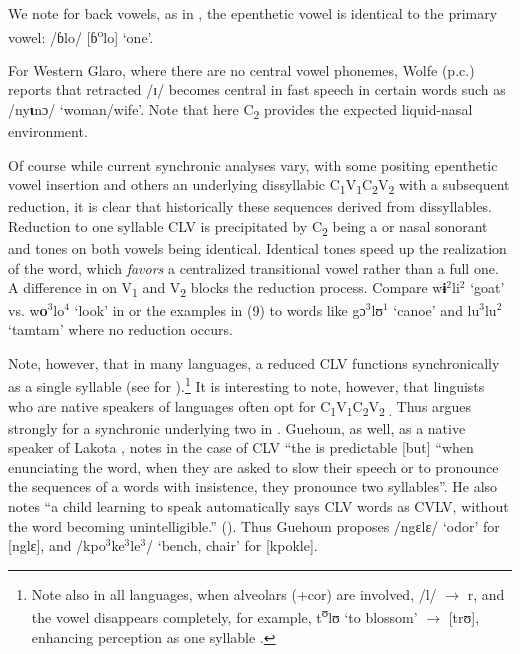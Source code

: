 \documentclass[output=paper,newtxmath,modfonts,nonflat]{langsci/langscibook}
\begin{document}
We note for back vowels, as in , the epenthetic vowel is identical to the primary vowel: /ɓlo/ [ɓ\textsuperscript{o}lo] ‘one’.  

For Western Glaro, where there are no central vowel phonemes, Wolfe (p.c.) reports that retracted /ɪ/ becomes central in fast speech in certain words such as /ny\textbf{ɩ}nɔ/ ‘woman/wife’. Note that here C\textsubscript{2} provides the expected liquid-nasal environment. 

Of course while current synchronic analyses vary, with some positing epenthetic vowel insertion and others an underlying dissyllabic C\textsubscript{1}V\textsubscript{1}C\textsubscript{2}V\textsubscript{2} with a subsequent reduction, it is clear that historically these sequences derived from dissyllables. Reduction to one syllable CLV is precipitated by C\textsubscript{2} being a  or nasal sonorant and tones on both vowels being identical. Identical tones speed up the realization of the word, which \textit{favors} a centralized transitional vowel rather than a full one.  A difference in  on V\textsubscript{1} and V\textsubscript{2} blocks the reduction process.  Compare w\textbf{ɨ$^2$}li$^2$ ‘goat’ vs. w\textbf{o$^3$}lo$^4$ ‘look’ in  \citep[20, 31]{Seri1987} or the  examples in (9) to words like gɔ$^3$lʊ$^1$ ‘canoe’ and lu$^3$lu$^2$ ‘tamtam’ where no reduction occurs.   

Note, however, that in many languages, a reduced CLV functions synchronically as a single syllable (see \citealt{Gratrix1975} for ){}.\footnote{Note also in all  languages, when alveolars (+cor) are involved, /l/ $\rightarrow$ r, and the vowel disappears completely, for example,  t\textsuperscript{ʊ}lʊ ‘to blossom’ $\rightarrow$ [trʊ], enhancing perception as one syllable \citep{Marchese1979/1983}.} It is interesting to note, however, that linguists who are native speakers of  languages often opt for C\textsubscript{1}V\textsubscript{1}C\textsubscript{2}V\textsubscript{2 .}  Thus \citet{Kipre2015} argues strongly for a synchronic underlying two  in  . Guehoun, as well, as a native speaker of Lakota , notes in the case of CLV “the  is predictable [but] “when enunciating the word, when they are asked to slow their speech or to pronounce the sequences of a words with insistence, they pronounce two syllables”. He also notes “a child learning to speak automatically says CLV words as CVLV, without the word becoming unintelligible.” (\citeyear[55–56]{Guehoun1993}). Thus Guehoun proposes /ngɛlɛ/ ‘odor’ for [nglɛ], and /kpo$^3$ke$^3$le$^3$/ ‘bench, chair’ for [kpokle].  
\end{document}
